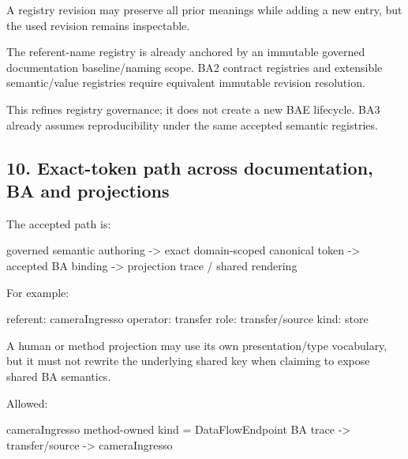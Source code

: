 \documentclass[
  10pt,
  a4paper,
]{article}
\newenvironment{Shaded}{}{}
\newcommand{\NormalTok}[1]{#1}
\begin{document}
A registry revision may preserve all prior meanings while adding a new
entry, but the used revision remains inspectable.

The referent-name registry is already anchored by an immutable governed
documentation baseline/naming scope. BA2 contract registries and
extensible semantic/value registries require equivalent immutable
revision resolution.

This refines registry governance; it does not create a new BAE
lifecycle. BA3 already assumes reproducibility under the same accepted
semantic registries.

\subsection{10. Exact-token path across documentation, BA and
projections}\label{exact-token-path-across-documentation-ba-and-projections}

The accepted path is:

\begin{Shaded}
\begin{Highlighting}[]
\NormalTok{governed semantic authoring}
\NormalTok{  {-}\textgreater{} exact domain{-}scoped canonical token}
\NormalTok{      {-}\textgreater{} accepted BA binding}
\NormalTok{          {-}\textgreater{} projection trace / shared rendering}
\end{Highlighting}
\end{Shaded}

For example:

\begin{Shaded}
\begin{Highlighting}[]
\NormalTok{referent: cameraIngresso}
\NormalTok{operator: transfer}
\NormalTok{role: transfer/source}
\NormalTok{kind: store}
\end{Highlighting}
\end{Shaded}

A human or method projection may use its own presentation/type
vocabulary, but it must not rewrite the underlying shared key when
claiming to expose shared BA semantics.

Allowed:

\begin{Shaded}
\begin{Highlighting}[]
\NormalTok{[FlowParticipant] cameraIngresso}
\NormalTok{method{-}owned kind = DataFlowEndpoint}
\NormalTok{BA trace {-}\textgreater{} transfer/source {-}\textgreater{} cameraIngresso}
\end{Highlighting}
\end{Shaded}
\end{document}
